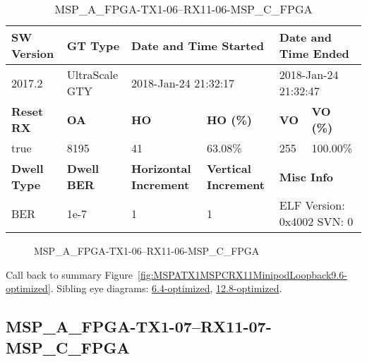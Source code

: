 \begin{table}[h]
\centering
\caption{MSP\_A\_FPGA-TX1-06--RX11-06-MSP\_C\_FPGA}
\label{tab:MSPAFPGATX106RX1106MSPCFPGA9.6-optimized}
\begin{tabular}{@{}|l|l|l|l|l|l|@{}}
\toprule
\textbf{SW Version}                & \textbf{GT Type}   & \multicolumn{2}{l|}{\textbf{Date and Time Started}}            & \multicolumn{2}{l|}{\textbf{Date and Time Ended}}        \\ \midrule
2017.2                       & UltraScale GTY          & \multicolumn{2}{l|}{2018-Jan-24 21:32:17}                   & \multicolumn{2}{l|}{2018-Jan-24 21:32:47}               \\ \midrule
\textbf{Reset RX}                  & \textbf{OA} & \textbf{HO}   & \textbf{HO (\%)} & \textbf{VO} & \textbf{VO (\%)} \\ \midrule
true & 8195        & 41          & 63.08\%        & 255        & 100.00\%       \\ \midrule
\textbf{Dwell Type}                & \textbf{Dwell BER} & \textbf{Horizontal Increment} & \textbf{Vertical Increment}    & \multicolumn{2}{l|}{\textbf{Misc Info}}                  \\ \midrule
BER                            & 1e-7        & 1        & 1           & \multicolumn{2}{l|}{ELF Version: 0x4002 SVN: 0}                         \\ \bottomrule
\end{tabular}
\end{table}

\begin{figure}[h]
\caption{MSP\_A\_FPGA-TX1-06--RX11-06-MSP\_C\_FPGA} \label{fig:MSPAFPGATX106RX1106MSPCFPGA9.6-optimized}
\end{figure}

Call back to summary Figure~\ref{fig:MSPATX1MSPCRX11MinipodLoopback9.6-optimized}.
Sibling eye diagrams: \hyperref[sec:MSPAFPGATX106RX1106MSPCFPGA6.4-optimized]{6.4-optimized}, \hyperref[sec:MSPAFPGATX106RX1106MSPCFPGA12.8-optimized]{12.8-optimized}.

\clearpage
\newpage


\subsection{MSP\_A\_FPGA-TX1-07--RX11-07-MSP\_C\_FPGA}\label{sec:MSPAFPGATX107RX1107MSPCFPGA9.6-optimized}

